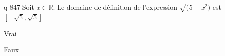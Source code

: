\begin{truefalse}{q-847}
Soit $x\in \mathbb R$. Le domaine de définition de l'expression $\sqrt(5-x^2)$ est $[-\sqrt{5},\sqrt{5}]$.
\item* Vrai
\item Faux
\end{truefalse}

